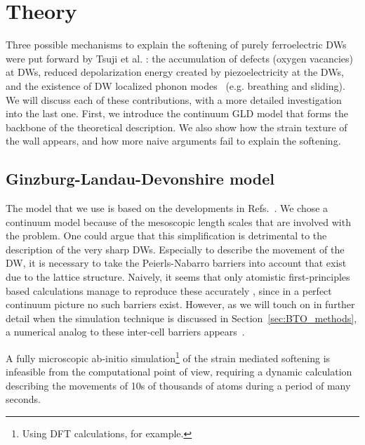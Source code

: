 \section{Theory \label{sec:BTO_theory}}
Three possible mechanisms to explain the softening of purely ferroelectric \glspl{DW} were put forward by Tsuji et al. \cite{Tsuji2005}: the accumulation of defects (oxygen vacancies) at \glspl{DW}, reduced depolarization energy created by piezoelectricity at the \glspl{DW}, and the existence of \gls{DW} localized phonon modes~\cite{Chen2020} (e.g. breathing and sliding). We will discuss each of these contributions, with a more detailed investigation into the last one.
First, we introduce the continuum \gls{GLD} model that forms the backbone of the theoretical description.
We also show how the strain texture of the wall appears, and how more naive arguments fail to explain the softening.

\subsection{Ginzburg-Landau-Devonshire model}
The model that we use is based on the developments in Refs.~\cite{Zhirnov1959,L.N.Bulaevskii1963,Marton2010}.
We chose a continuum model because of the mesoscopic length scales that are involved with the problem.
One could argue that this simplification is detrimental to the description of the very sharp \glspl{DW}.
Especially to describe the movement of the \gls{DW}, it is necessary to take the Peierls-Nabarro barriers into account that exist due to the lattice structure.
Naively, it seems that only atomistic first-principles based calculations manage to reproduce these accurately \cite{Meyer2002}, since in a perfect continuum picture no such barriers exist.
However, as we will touch on in further detail when the simulation technique is discussed in Section~\ref{sec:BTO_methods}, a numerical analog to these inter-cell barriers appears~\cite{Marton2018}.

A fully microscopic ab-initio simulation\footnote{Using \gls{DFT} calculations, for example.} of the strain mediated softening is infeasible from the computational point of view, requiring a dynamic calculation describing the movements of 10s of thousands of atoms during a period of many seconds.

